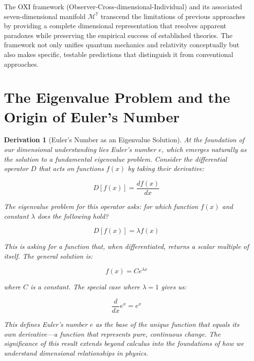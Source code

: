 \documentclass{article}
\newtheorem{derivation}{Derivation}
\begin{document}
The OXI framework (Observer-Cross-dimensional-Individual) and its associated seven-dimensional manifold $\mathcal{M}^7$ transcend the limitations of previous approaches by providing a complete dimensional representation that resolves apparent paradoxes while preserving the empirical success of established theories. The framework not only unifies quantum mechanics and relativity conceptually but also makes specific, testable predictions that distinguish it from conventional approaches.

\section{The Eigenvalue Problem and the Origin of Euler's Number}

\begin{derivation}[Euler's Number as an Eigenvalue Solution]
At the foundation of our dimensional understanding lies Euler's number $e$, which emerges naturally as the solution to a fundamental eigenvalue problem. Consider the differential operator $D$ that acts on functions $f(x)$ by taking their derivative:

\begin{equation}
D[f(x)] = \frac{df(x)}{dx}
\end{equation}

The eigenvalue problem for this operator asks: for which function $f(x)$ and constant $\lambda$ does the following hold?

\begin{equation}
D[f(x)] = \lambda f(x)
\end{equation}

This is asking for a function that, when differentiated, returns a scalar multiple of itself. The general solution is:

\begin{equation}
f(x) = Ce^{\lambda x}
\end{equation}

where $C$ is a constant. The special case where $\lambda = 1$ gives us:

\begin{equation}
\frac{d}{dx}e^x = e^x
\end{equation}

This defines Euler's number $e$ as the base of the unique function that equals its own derivative—a function that represents pure, continuous change. The significance of this result extends beyond calculus into the foundations of how we understand dimensional relationships in physics.


\end{derivation}
\end{document}
